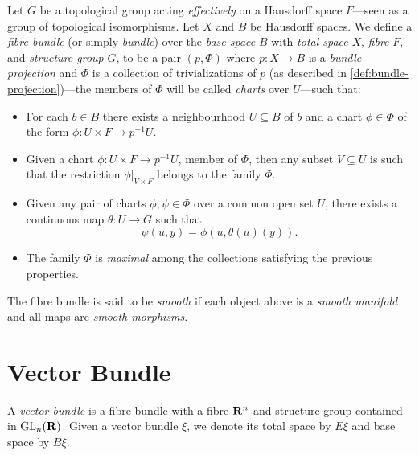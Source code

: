 \begin{definition}
\label{def:fibre-bundle}
Let \(G\) be a topological group acting \emph{effectively} on a Hausdorff space
\(F\)---seen as a group of topological isomorphisms. Let \(X\) and \(B\) be
Hausdorff spaces. We define a \emph{fibre bundle} (or simply \emph{bundle}) over
the \emph{base space} \(B\) with \emph{total space} \(X\), \emph{fibre} \(F\),
and \emph{structure group} \(G\), to be a pair \((p, \Phi)\) where
\(p: X \to B\) is a \emph{bundle projection} and \(\Phi\) is a collection of
trivializations of \(p\) (as described in \cref{def:bundle-projection})---the
members of \(\Phi\) will be called \emph{charts} over \(U\)---such that:
\begin{itemize}\setlength\itemsep{0em}
\item For each \(b \in B\) there exists a neighbourhood \(U \subseteq B\) of
  \(b\) and a chart \(\phi \in \Phi\) of the form
  \(\phi: U \times F \to p^{-1} U\).

\item Given a chart \(\phi: U \times F \to p^{-1} U\), member of \(\Phi\), then
  any subset \(V \subseteq U\) is such that the restriction
  \(\phi|_{V \times F}\) belongs to the family \(\Phi\).

\item Given any pair of charts \(\phi, \psi \in \Phi\) over a common open set
  \(U\), there exists a continuous map \(\theta: U \to G\) such that
  \[
  \psi(u, y) = \phi(u, \theta(u)(y)).
  \]

\item The family \(\Phi\) is \emph{maximal} among the collections satisfying the
  previous properties.
\end{itemize}
The fibre bundle is said to be \emph{smooth} if each object above is a
\emph{smooth manifold} and all maps are \emph{smooth morphisms}.
\end{definition}

\section{Vector Bundle}

\begin{definition}
\label{def:vector-bundle}
A \emph{vector bundle} is a fibre bundle with a fibre \(\mathbf{R}^n\) and structure
group contained in \(\operatorname{GL}_n(\mathbf{R})\). Given a vector bundle \(\xi\), we denote its
total space by \(E \xi\) and base space by \(B \xi\).
\end{definition}

